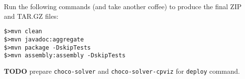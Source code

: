 \documentclass[11pt]{amsart}
\newcommand{\mylst}[1]{\lstinline|#1|}
\begin{document}
\vspace{.5cm}
Run the following commands (and take another coffee) to produce the final ZIP and TAR.GZ files:
\begin{lstlisting}
$>mvn clean
$>mvn javadoc:aggregate
$>mvn package -DskipTests
$>mvn assembly:assembly -DskipTests
\end{lstlisting}

\textbf{TODO} prepare \mylst{choco-solver} and \mylst{choco-solver-cpviz} for \mylst{deploy} command.

\end{document}
